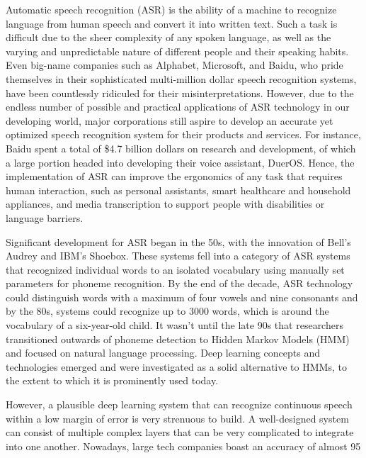 Automatic speech recognition (ASR) is the ability of a machine to recognize language from human speech and convert it into written text. Such a task is difficult due to the sheer complexity of any spoken language, as well as the varying and unpredictable nature of different people and their speaking habits. Even big-name companies such as Alphabet, Microsoft, and Baidu, who pride themselves in their sophisticated multi-million dollar speech recognition systems, have been countlessly ridiculed for their misinterpretations. However, due to the endless number of possible and practical applications of ASR technology in our developing world, major corporations still aspire to develop an accurate yet optimized speech recognition system for their products and services. For instance, Baidu spent a total of \$4.7 billion dollars on research and development, of which a large portion headed into developing their voice assistant, DuerOS. Hence, the implementation of ASR can improve the ergonomics of any task that requires human interaction, such as personal assistants, smart healthcare and household appliances, and media transcription to support people with disabilities or language barriers. 
\newline\par
Significant development for ASR began in the 50s, with the innovation of Bell’s Audrey and IBM’s Shoebox. These systems fell into a category of ASR systems that recognized individual words to an isolated vocabulary using manually set parameters for phoneme recognition. By the end of the decade, ASR technology could distinguish words with a maximum of four vowels and nine consonants and by the 80s, systems could recognize up to 3000 words, which is around the vocabulary of a six-year-old child. It wasn’t until the late 90s that researchers transitioned outwards of phoneme detection to Hidden Markov Models (HMM) and focused on natural language processing. Deep learning concepts and technologies emerged and were investigated as a solid alternative to HMMs, to the extent to which it is prominently used today.
\newline\par
However, a plausible deep learning system that can recognize continuous speech within a low margin of error is very strenuous to build. A well-designed system can consist of multiple complex layers that can be very complicated to integrate into one another. Nowadays, large tech companies boast an accuracy of almost 95%

